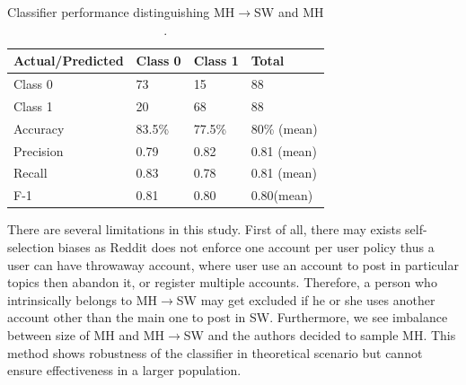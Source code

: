 \begin{table}
\small
\noindent\begin{tabularx}{\textwidth}{X|X|X|X}
Actual/Predicted & Class 0 & Class 1 & Total\\ 
\toprule
Class 0 & 73 & 15  & 88\\
Class 1 & 20 &  68 & 88\\ 
\midrule
Accuracy  & 83.5\%  & 77.5\% & 80\% (mean)\\
Precision & 0.79  &   0.82  & 0.81   (mean)\\
Recall     & 0.83   &    0.78   & 0.81 (mean)\\
F-1        &    0.81  &  0.80     &  0.80(mean)\\
\bottomrule
\end{tabularx}
\caption{Classifier performance distinguishing MH$\rightarrow$SW and MH \cite{DeChoudhury2016}.}
\label{tab:classifier_performance}
\end{table}
There are several limitations in this study. First of all, there may exists self-selection biases as Reddit does not enforce one account per user policy thus a user can have throwaway account, where user use an account to post in particular topics then abandon it, or register multiple accounts. Therefore, a person who intrinsically belongs to  MH$\rightarrow$SW may get excluded if he or she uses another account other than the main one to post in SW. Furthermore, we see imbalance between size of MH and MH$\rightarrow$SW and the authors decided to sample MH. This method shows robustness of the classifier in theoretical scenario but cannot ensure effectiveness in a larger population. 
